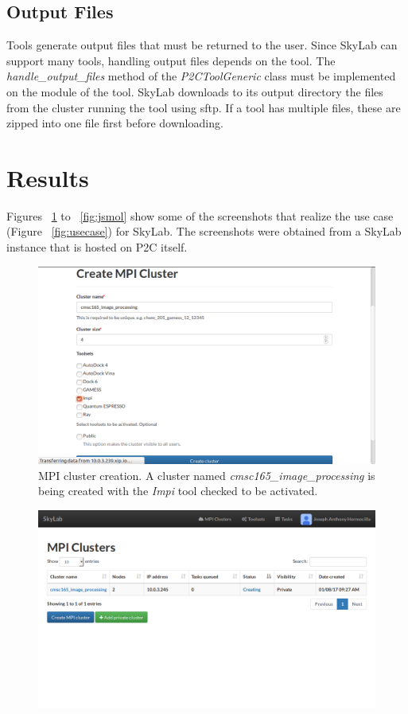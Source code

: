 \subsection{Output Files}
Tools generate output files that must be returned to the user. Since SkyLab can support many tools, handling output files depends on the tool. The \textit{handle\_output\_files} method of the \textit{P2CToolGeneric} class must be implemented on the module of the tool. SkyLab downloads to its output directory the files from the cluster running the tool using sftp. If a tool has multiple files, these are zipped into one file first before downloading.
	
\section{Results}
Figures ~\ref{fig:mpicreate} to ~\ref{fig:jsmol} show some of the screenshots that realize the use case (Figure ~\ref{fig:usecase}) for SkyLab. The screenshots were obtained from a SkyLab instance that is hosted on P2C itself.

		
\begin{figure}			
	\includegraphics[scale=0.93]{./images/n_create_cluster_impi_printed.png}
	\caption{\label{fig:mpicreate}MPI cluster creation. A cluster named \textit{cmsc165\_image\_processing} is being created with the \textit{Impi} tool checked to be activated.}			
\end{figure}	
	
\begin{figure}			
	\includegraphics{./images/n_active_cluster_printed.png}
\end{figure}
		
